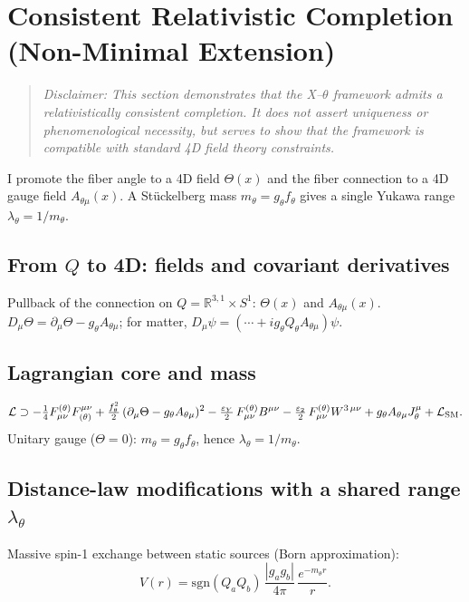 \section{Consistent Relativistic Completion (Non-Minimal Extension)}\label{sec:unified-force}

\begin{quote}
\emph{Disclaimer: This section demonstrates that the X--$\theta$ framework admits a relativistically consistent completion. It does not assert uniqueness or phenomenological necessity, but serves to show that the framework is compatible with standard 4D field theory constraints.}
\end{quote}

I promote the fiber angle to a 4D field $\Theta(x)$ and the fiber connection to a 4D gauge field $A_{\theta\mu}(x)$. A St\"uckelberg mass $m_\theta = g_\theta f_\theta$ gives a single Yukawa range $\lambda_\theta = 1/m_\theta$.

\subsection{From $Q$ to 4D: fields and covariant derivatives}
Pullback of the connection on $Q=\mathbb R^{3,1}\times S^1$: $\Theta(x)$ and $A_{\theta\mu}(x)$. $D_\mu\Theta = \partial_\mu\Theta - g_\theta A_{\theta\mu}$; for matter, $D_\mu\psi = (\cdots + i g_\theta Q_\theta A_{\theta\mu})\psi$.

\subsection{Lagrangian core and mass}
\begin{equation}
\mathcal{L} \supset -\tfrac14 F^{(\theta)}_{\mu\nu} F_{(\theta)}^{\mu\nu} + \tfrac{f_\theta^2}{2}\,(\partial_\mu \Theta - g_\theta A_{\theta\mu})^2 - \tfrac{\varepsilon_Y}{2}\,F^{(\theta)}_{\mu\nu} B^{\mu\nu} - \tfrac{\varepsilon_2}{2}\,F^{(\theta)}_{\mu\nu} W^{3\,\mu\nu} + g_\theta A_{\theta\mu} J_\theta^\mu + \mathcal{L}_{\rm SM}.
\end{equation}
Unitary gauge ($\Theta=0$): $m_\theta=g_\theta f_\theta$, hence $\lambda_\theta=1/m_\theta$.

\subsection{Distance-law modifications with a shared range $\lambda_\theta$}
Massive spin-1 exchange between static sources (Born approximation):
\[
  V(r) = \mathrm{sgn}(Q_a Q_b)\, \frac{|g_a g_b|}{4\pi}\, \frac{e^{-m_\theta r}}{r}.
\]

